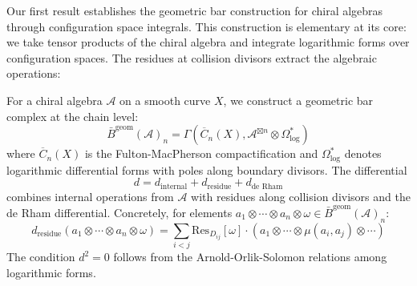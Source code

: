 Our first result establishes the geometric bar construction for chiral algebras through configuration space integrals. This construction is elementary at its core: we take tensor products of the chiral algebra and integrate logarithmic forms over configuration spaces. The residues at collision divisors extract the algebraic operations:

\begin{theorem}
For a chiral algebra $\mathcal{A}$ on a smooth curve $X$, we construct a geometric bar complex at the chain level:
$$\bar{B}^{\text{geom}}(\mathcal{A})_n = \Gamma\left(\overline{C}_n(X), \mathcal{A}^{\boxtimes n} \otimes \Omega^*_{\text{log}}\right)$$
where $\overline{C}_n(X)$ is the Fulton-MacPherson compactification and $\Omega^*_{\text{log}}$ denotes logarithmic differential forms with poles along boundary divisors. The differential 
$$d = d_{\text{internal}} + d_{\text{residue}} + d_{\text{de Rham}}$$
combines internal operations from $\mathcal{A}$ with residues along collision divisors and the de Rham differential. Concretely, for elements $a_1 \otimes \cdots \otimes a_n \otimes \omega \in \bar{B}^{\text{geom}}(\mathcal{A})_n$:
$$d_{\text{residue}}(a_1 \otimes \cdots \otimes a_n \otimes \omega) = \sum_{i<j} \text{Res}_{D_{ij}}[\omega] \cdot (a_1 \otimes \cdots \otimes \mu(a_i, a_j) \otimes \cdots)$$
The condition $d^2 = 0$ follows from the Arnold-Orlik-Solomon relations among logarithmic forms.
\end{theorem}

